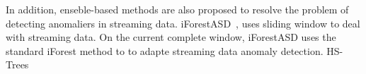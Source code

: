 In addition,
enseble-based methods are also proposed to
resolve the problem of detecting anomaliers
in streaming data.
iForestASD~\cite{ding2013anomaly},
uses sliding window to deal with streaming
data.
On the current complete window,
iForestASD uses the standard
iForest method to to adapte streaming
data anomaly detection.
HS-Trees~\cite{tan2011fast}


